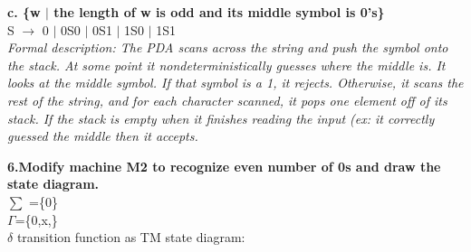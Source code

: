 \documentclass{scrartcl}
\begin{document}
\textbf{c. \{w $|$ the length of w is odd and its middle symbol is 0's\}}\\

S $\rightarrow$ 0 $|$  0S0 $|$ 0S1 $|$ 1S0 $|$ 1S1 \\
\textit{Formal description: The PDA scans across the string and push the symbol onto the stack. At some point it nondeterministically guesses where the middle is. It looks at the middle symbol. If that symbol is a 1, it rejects. Otherwise, it scans the rest of the string, and for each character scanned, it pops one element off of its stack. If the stack is empty when it finishes reading the input (ex: it correctly guessed the middle then it accepts.}\\

\begin{center}
\end{center}
\textbf{ 6.Modify machine M2 to recognize even number of 0s and draw the state diagram.}\\
$\sum$ =\{0\}\\
$\Gamma$=\{0,x,\textvisiblespace\}\\
$\delta$ transition function as TM state diagram:\\
\end{document}
